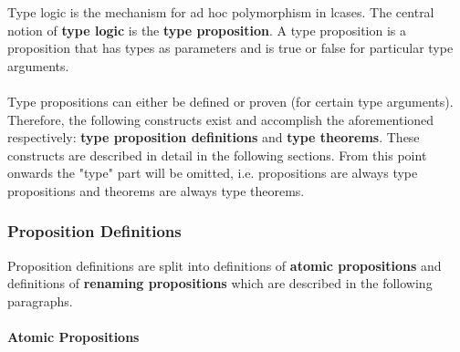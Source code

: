 \documentclass{article}
\begin{document}
Type logic is the mechanism for ad hoc polymorphism in lcases. The central
notion of \textbf{type logic} is the \textbf{type proposition}. A type
proposition is a proposition that has types as parameters and is true or false
for particular type arguments.
\\\\
Type propositions can either be defined or proven (for certain type arguments).
Therefore, the following constructs exist and accomplish the aforementioned
respectively: \textbf{type proposition definitions} and \textbf{type theorems}.
These constructs are described in detail in the following sections. From this
point onwards the "type" part will be omitted, i.e. propositions are always
type propositions and theorems are always type theorems. 

\subsubsection{Proposition Definitions}

Proposition definitions are split into definitions of \textbf{atomic
propositions} and definitions of \textbf{renaming propositions} which are
described in the following paragraphs.

\paragraph{Atomic Propositions}
\end{document}
